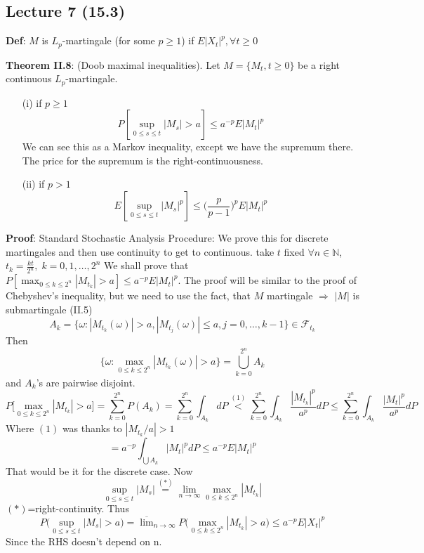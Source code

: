\documentclass[english]{article}
\newcommand{\N}{\mathbb{N}}
\newcommand{\note}[1]{\noindent\textbf{#1}}
\newcommand{\F}{\mathcal F}
\begin{document}
\subsection*{Lecture 7 (15.3) }
\note{Def}: $M$ is $L_p$-martingale (for some $p\geq 1$) if $E|X_t|^p, \forall t \geq 0$\newline

\note{Theorem II.8}: (Doob maximal inequalities). Let $M=\{M_t , t\geq 0\}$ be a right continuous $L_p$-martingale. \begin{enumerate}
\item[(i)] if $p\geq 1$
$$P[\sup_{0\leq s \leq t} |M_s| > a ] \leq a^{-p} E|M_t|^p$$
We can see this as a Markov inequality, except we have the supremum there. The price for the supremum is the right-continuousness.
\item[(ii)] if $p>1$
$$E[\sup_{0\leq s \leq t} |M_s|^p ] \leq \Big( \frac{p}{p-1}\Big)^p E|M_t|^p$$
\end{enumerate}
\note{Proof}: Standard Stochastic Analysis Procedure: We prove this for discrete martingales and then use continuity to get to continuous.\newline
take $t$ fixed $\forall n \in \N$, $t_k = \frac{kt}{2^n},\; k=0,1,\dots, 2^n$ \newline
We shall prove that $P[\max_{0\leq k \leq 2^n} |M_{t_k}| > a ] \leq a^{-p} E|M_t|^p$. The proof will be similar to the proof of Chebyshev's inequality, but we need to use the fact, that $M$ martingale $\Rightarrow$ $|M|$ is submartingale (II.5)
$$A_k = \{\omega: |M_{t_k}(\omega)| > a, |M_{t_j}(\omega)| \leq a, j=0,\dots, k-1\} \in \F_{t_k}$$
Then
$$\{\omega: \max_{0\leq k \leq 2^n} |M_{t_k} (\omega)| > a \} = \bigcup^{2^n}_{k=0} A_k$$
and $A_k$'s are pairwise disjoint.
$$P\Big[\max_{0\leq k \leq 2^n} |M_{t_k}| > a \Big] = \sum^{2^n}_{k=0} P(A_k) = \sum^{2^n}_{k=0} \int_{A_k} dP \stackrel{(1)}< \sum^{2^n}_{k=0} \int_{A_k} \frac{|M_{t_k}|^p}{a^p} dP \leq  \sum^{2^n}_{k=0} \int_{A_k} \frac{|M_{t}|^p}{a^p} dP$$
Where $(1)$ was thanks to $|M_{t_k}/a| > 1$
$$= a^{-p} \int_{\bigcup A_k} |M_t|^p dP \leq a^{-p} E|M_t|^p$$
That would be it for the discrete case. Now
$$\sup_{0\leq s \leq t} |M_s| \stackrel{(\ast)}= \lim_{n\to \infty} \max_{0\leq k \leq 2^n} |M_{t_k}|$$
$(\ast)$=right-continuity. Thus
$$P\Big(\sup_{0\leq s \leq t} |M_s| > a \Big) = \overline \lim_{n\to \infty} P \Big(\max_{0\leq k \leq 2^n} |M_{t_k}| > a \Big) \leq a^{-p} E|X_t|^p$$
Since the RHS doesn't depend on n. \newline
\end{document}
